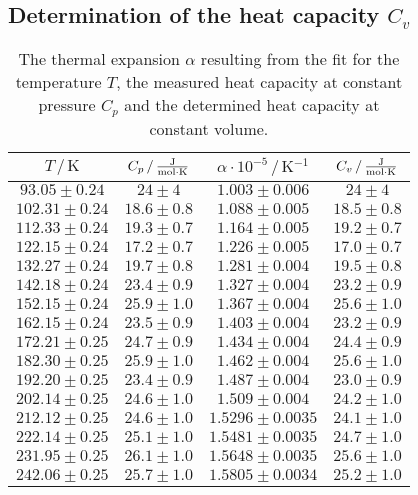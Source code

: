 \subsection{Determination of the heat capacity $C_v$}
\begin{table}
    \centering
    \caption{The thermal expansion $\alpha$ resulting from the fit for the temperature $T$, the measured heat capacity at constant pressure $C_p$ and the determined heat capacity at constant volume.}
    \label{tab:C_v}
    \begin{tabular}{c c c c}
        \toprule
        $T \,/\, \unit{\kelvin}$ & $C_p \,/\, \unit{\frac{\joule}{\mol \cdot \kelvin}}$ & $\alpha \cdot 10^{-5} \,/\, \unit{\kelvin^{-1}}$ & $C_v \,/\, \unit{\frac{\joule}{\mol \cdot \kelvin}}$\\
        \midrule
        $93.05\pm0.24$ & $24\pm4$ & $1.003\pm0.006$ & $24\pm4$ \\
        $102.31\pm0.24$ & $18.6\pm0.8$ & $1.088\pm0.005$ & $18.5\pm0.8$ \\
        $112.33\pm0.24$ & $19.3\pm0.7$ & $1.164\pm0.005$ & $19.2\pm0.7$ \\
        $122.15\pm0.24$ & $17.2\pm0.7$ & $1.226\pm0.005$ & $17.0\pm0.7$ \\
        $132.27\pm0.24$ & $19.7\pm0.8$ & $1.281\pm0.004$ & $19.5\pm0.8$ \\
        $142.18\pm0.24$ & $23.4\pm0.9$ & $1.327\pm0.004$ & $23.2\pm0.9$ \\
        $152.15\pm0.24$ & $25.9\pm1.0$ & $1.367\pm0.004$ & $25.6\pm1.0$ \\
        $162.15\pm0.24$ & $23.5\pm0.9$ & $1.403\pm0.004$ & $23.2\pm0.9$ \\
        $172.21\pm0.25$ & $24.7\pm0.9$ & $1.434\pm0.004$ & $24.4\pm0.9$ \\
        $182.30\pm0.25$ & $25.9\pm1.0$ & $1.462\pm0.004$ & $25.6\pm1.0$ \\
        $192.20\pm0.25$ & $23.4\pm0.9$ & $1.487\pm0.004$ & $23.0\pm0.9$ \\
        $202.14\pm0.25$ & $24.6\pm1.0$ & $1.509\pm0.004$ & $24.2\pm1.0$ \\
        $212.12\pm0.25$ & $24.6\pm1.0$ & $1.5296\pm0.0035$ & $24.1\pm1.0$ \\
        $222.14\pm0.25$ & $25.1\pm1.0$ & $1.5481\pm0.0035$ & $24.7\pm1.0$ \\
        $231.95\pm0.25$ & $26.1\pm1.0$ & $1.5648\pm0.0035$ & $25.6\pm1.0$ \\
        $242.06\pm0.25$ & $25.7\pm1.0$ & $1.5805\pm0.0034$ & $25.2\pm1.0$ \\

\end{tabular}
\end{table}
